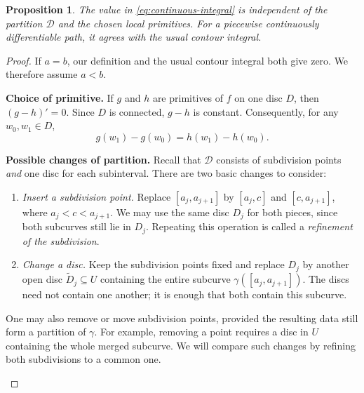 \documentclass[11pt]{article}
\theoremstyle{plain}
\newtheorem{proposition}[theorem]{Proposition}
\theoremstyle{definition}
\theoremstyle{remark}
\numberwithin{equation}{section}
\begin{document}
\begin{proposition}\label{prop:well-defined}
The value in \eqref{eq:continuous-integral} is independent of the
partition $\mathscr{D}$ and the chosen local primitives. For a piecewise
continuously differentiable path, it agrees with the usual contour integral.
\end{proposition}
\begin{proof}
If $a=b$, our definition and the usual contour integral both give zero.
We therefore assume $a<b$.

\textbf{Choice of primitive.} If $g$ and $h$ are primitives of $f$ on
one disc $D$, then $(g-h)'=0$. Since $D$ is connected, $g-h$ is constant.
Consequently, for any $w_0,w_1\in D$,
\[
 g(w_1)-g(w_0)=h(w_1)-h(w_0).
\]

\textbf{Possible changes of partition.}
Recall that $\mathscr{D}$ consists of subdivision points \emph{and}
one disc for each subinterval. There are two basic changes to consider:
\begin{enumerate}
 \item \emph{Insert a subdivision point.} Replace $[a_j,a_{j+1}]$ by
 $[a_j,c]$ and $[c,a_{j+1}]$, where $a_j<c<a_{j+1}$. We may use the
 same disc $D_j$ for both pieces, since both subcurves still lie in $D_j$.
 Repeating this operation is called a \emph{refinement of the subdivision}.
 \item \emph{Change a disc.} Keep the subdivision points fixed and
 replace $D_j$ by another open disc $\widetilde D_j\subseteq U$ containing
 the entire subcurve $\gamma([a_j,a_{j+1}])$. The discs need not contain
 one another; it is enough that both contain this subcurve.
\end{enumerate}
One may also remove or move subdivision points, provided the resulting
data still form a partition of $\gamma$. For example, removing a point
requires a disc in $U$ containing the whole merged subcurve. We will
compare such changes by refining both subdivisions to a common one.

\begin{center}
\end{center}


\end{proof}
\end{document}
